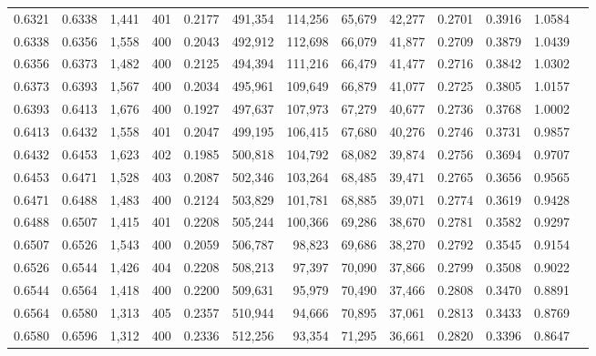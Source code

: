\begin{tabular}{rrrrrrrrrrrrr}
0.6321 & 0.6338 & 1,441 & 401 &                                     0.2177 & 491,354 & 114,256 &  65,679 &  42,277 & 0.2701 & 0.3916 & 1.0584 \\
0.6338 & 0.6356 & 1,558 & 400 &                                     0.2043 & 492,912 & 112,698 &  66,079 &  41,877 & 0.2709 & 0.3879 & 1.0439 \\
0.6356 & 0.6373 & 1,482 & 400 &                                     0.2125 & 494,394 & 111,216 &  66,479 &  41,477 & 0.2716 & 0.3842 & 1.0302 \\
0.6373 & 0.6393 & 1,567 & 400 &                                     0.2034 & 495,961 & 109,649 &  66,879 &  41,077 & 0.2725 & 0.3805 & 1.0157 \\
0.6393 & 0.6413 & 1,676 & 400 &                                     0.1927 & 497,637 & 107,973 &  67,279 &  40,677 & 0.2736 & 0.3768 & 1.0002 \\
0.6413 & 0.6432 & 1,558 & 401 &                                     0.2047 & 499,195 & 106,415 &  67,680 &  40,276 & 0.2746 & 0.3731 & 0.9857 \\
0.6432 & 0.6453 & 1,623 & 402 &                                     0.1985 & 500,818 & 104,792 &  68,082 &  39,874 & 0.2756 & 0.3694 & 0.9707 \\
0.6453 & 0.6471 & 1,528 & 403 &                                     0.2087 & 502,346 & 103,264 &  68,485 &  39,471 & 0.2765 & 0.3656 & 0.9565 \\
0.6471 & 0.6488 & 1,483 & 400 &                                     0.2124 & 503,829 & 101,781 &  68,885 &  39,071 & 0.2774 & 0.3619 & 0.9428 \\
0.6488 & 0.6507 & 1,415 & 401 &                                     0.2208 & 505,244 & 100,366 &  69,286 &  38,670 & 0.2781 & 0.3582 & 0.9297 \\
0.6507 & 0.6526 & 1,543 & 400 &                                     0.2059 & 506,787 &  98,823 &  69,686 &  38,270 & 0.2792 & 0.3545 & 0.9154 \\
0.6526 & 0.6544 & 1,426 & 404 &                                     0.2208 & 508,213 &  97,397 &  70,090 &  37,866 & 0.2799 & 0.3508 & 0.9022 \\
0.6544 & 0.6564 & 1,418 & 400 &                                     0.2200 & 509,631 &  95,979 &  70,490 &  37,466 & 0.2808 & 0.3470 & 0.8891 \\
0.6564 & 0.6580 & 1,313 & 405 &                                     0.2357 & 510,944 &  94,666 &  70,895 &  37,061 & 0.2813 & 0.3433 & 0.8769 \\
0.6580 & 0.6596 & 1,312 & 400 &                                     0.2336 & 512,256 &  93,354 &  71,295 &  36,661 & 0.2820 & 0.3396 & 0.8647 \\

\end{tabular}
